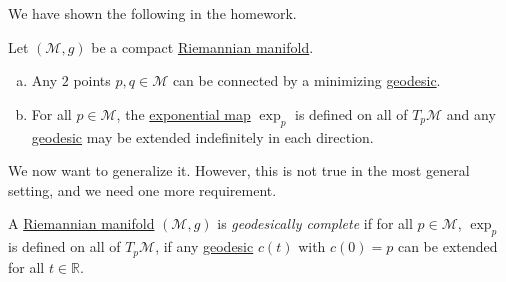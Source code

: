 We have shown the following in the homework.

\begin{theorem}
	Let \((\mathcal{M} , g)\) be a compact \hyperref[def:Riemannian-manifold]{Riemannian manifold}.
	\begin{enumerate}[(a)]
		\item Any \(2\) points \(p, q\in \mathcal{M} \) can be connected by a minimizing \hyperref[def:geodesic]{geodesic}.
		\item For all \(p\in \mathcal{M} \), the \hyperref[def:exponential-map]{exponential map} \(\exp _p\) is defined on all of \(T_p \mathcal{M} \) and any \hyperref[def:geodesic]{geodesic} may be extended indefinitely in each direction.
	\end{enumerate}
\end{theorem}

We now want to generalize it. However, this is not true in the most general setting, and we need one more requirement.

\begin{definition}\label{def:geodesically-complete}
	A \hyperref[def:Riemannian-manifold]{Riemannian manifold} \((\mathcal{M} , g)\) is \emph{geodesically complete} if for all \(p\in \mathcal{M} \), \(\exp _p\) is defined on all of \(T_p \mathcal{M} \), if any \hyperref[def:geodesic]{geodesic} \(c(t)\) with \(c(0) = p\) can be extended for all \(t\in \mathbb{R} \).
\end{definition}



